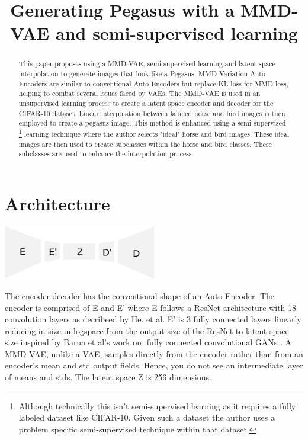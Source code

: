 \documentclass{article}
\title{Generating Pegasus with a MMD-VAE and semi-supervised learning}
\begin{document}
\maketitle
\begin{abstract}
    This paper proposes using a MMD-VAE, semi-supervised learning and latent space interpolation to generate images that look like a Pegasus. MMD Variation Auto Encoders are similar to conventional Auto Encoders but replace KL-loss for MMD-loss, helping to combat several issues faced by VAEs. The MMD-VAE is used in an unsupervised learning process to create a latent space encoder and decoder for the CIFAR-10 dataset. Linear interpolation between labeled horse and bird images is then employed to create a pegasus image. This method is enhanced using a semi-supervised \footnote{Although technically this isn't semi-supervised learning as it requires a fully labeled dataset like CIFAR-10. Given such a dataset the author uses a problem specific semi-supervised technique within that dataset.} learning technique where the author selects "ideal" horse and bird images. These ideal images are then used to create subclasses within the horse and bird classes. These subclasses are used to enhance the interpolation process.

\end{abstract}

\section{Architecture}
\begin{center}
    \includegraphics[width=0.5\textwidth]{figures/Encoder.png}
\end{center}
The encoder decoder has the conventional shape of an Auto Encoder.
The encoder is comprised of E and E' where E follows a ResNet \cite{ResNet} architecture with 18 convolution layers as decribeed by He. et al. E' is 3 fully connected layers linearly reducing in size in logspace from the output size of the ResNet to latent space size inspired by Barua et al's work on: fully connected convolutional GANs \cite{fccGAN}. A MMD-VAE, unlike a VAE, samples directly from the encoder rather than from an encoder's mean and std output fields. Hence, you do not see an intermediate layer of means and stds. The latent space Z is 256 dimensions. 
\end{document}

